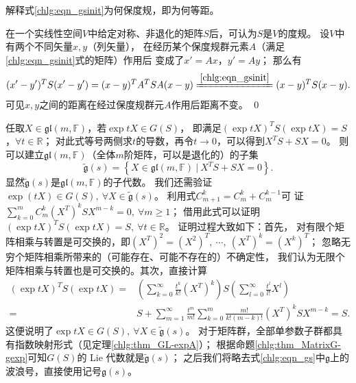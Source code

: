 \begin{example}
	解释式\eqref{chlg:eqn_gsinit}为何保度规，即为何等距。
	
	在一个实线性空间$V$中给定对称、非退化的矩阵$S$后，可认为$S$是$V$的度规。
	设$V$中有两个不同矢量$x,y$（列矢量），
	在经历某个保度规群元素$A$（满足\eqref{chlg:eqn_gsinit}式的矩阵）作用后
	变成了$x'=Ax$，$y'= Ay$；    那么有
	\begin{equation*}
		(x'-y')^T S (x'-y') = (x-y)^T A^T S A (x-y)
		\xlongequal{\ref{chlg:eqn_gsinit}}  (x-y)^T S (x-y).
	\end{equation*}
	可见$x,y$之间的距离在经过保度规群元$A$作用后{\kaishu 距离不变}。 \qed
\end{example}

任取$X\in \mathfrak{gl}(m,\mathbb{F})$，若$\exp tX \in G(S)$，
即满足$(\exp tX)^T S (\exp t{X}) = S$，$ \forall t\in \mathbb{R} $；
对此式等号两侧求$t$的导数，再令$t\to 0$，可以得到$X^T S + S {X} = 0 $。
则可以建立$\mathfrak{gl}(m,\mathbb{F})$（全体$m$阶矩阵，可以是退化的）的子集
\begin{equation} \label{chlg:eqn_gs}
    \tilde{\mathfrak{g}}(s) = \left\{ X \in \mathfrak{gl}(m,\mathbb{F}) \ |\ 
       X^T S + S {X} = 0 \right\} .
\end{equation}
显然$\tilde{\mathfrak{g}}(s)$是$\mathfrak{gl}(m,\mathbb{F})$的子代数。
我们还需验证$\exp(tX)\in G(S),\ \forall X \in \tilde{\mathfrak{g}}(s)$。%
利用式$C_{m + 1}^k = C_m^k + C_m^{k - 1}$可
证$ \sum_{k=0}^{m}C^k_m (X^T)^k S {X}^{m-k} =0, \ \forall m\geqslant 1 $；
借用此式可以证明$(\exp tX)^T S (\exp t{X}) = S, \ \forall t\in \mathbb{R}$。
证明过程大致如下：首先，
对有限个矩阵相乘与转置是可交换的，即$(X^T)^2 = (X^2)^T,\ \cdots,\ (X^T)^k = (X^k)^T$；
忽略无穷个矩阵相乘所带来的（可能存在、可能不存在的）不确定性，
我们认为无限个矩阵相乘与转置也是可交换的。其次，直接计算
\begin{align*}
    (\exp tX)^T S (\exp t{X}) = & \left(\sum_{k=0}^{\infty}\frac{t^k}{k!}({X}^T)^k\right)
    S\left(\sum_{l=0}^{\infty}\frac{t^l}{l!}X^l\right) \\
    =& S + \sum_{m=1}^{\infty}\frac{t^m}{m!} \sum_{k=0}^{m}
    \frac{m!}{k!(m-k)!} (X^T)^k S {X}^{m-k} =S .
\end{align*}
这便说明了$\exp tX \in G(S),\ \forall X\in \tilde{\mathfrak{g}}(s)$。
对于矩阵群，全部单参数子群都具有指数映射形式（见定理\ref{chlg:thm_GL-expA}）；
根据命题\ref{chlg:thm_MatrixG-gexp}可知$G(S)$的 Lie 代数就是$\tilde{\mathfrak{g}}(s)$；
之后我们将略去式\eqref{chlg:eqn_gs}中$\mathfrak{g}$上的波浪号，直接使用记号$\mathfrak{g}(s)$。



